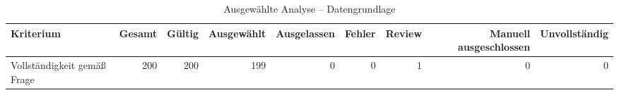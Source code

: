 \begin{table}[htbp]
\centering
\caption{Ausgewählte Analyse -- Datengrundlage}
\begin{tabular}{lrrrrrrrr}
\toprule
Kriterium & Gesamt & Gültig & Ausgewählt & Ausgelassen & Fehler & Review & Manuell ausgeschlossen & Unvollständig \\
\midrule
Vollständigkeit gemäß Frage & 200 & 200 & 199 & 0 & 0 & 1 & 0 & 0 \\
\bottomrule
\end{tabular}
\end{table}
